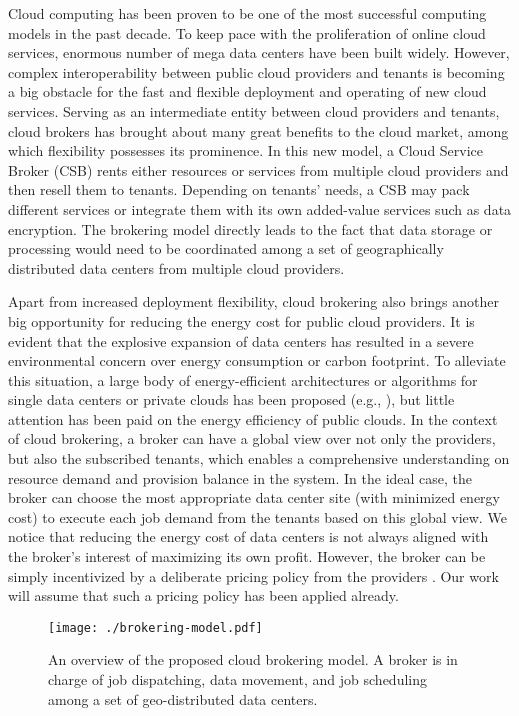 \documentclass{article}
\begin{document}
Cloud computing has been proven to be one of the most successful computing models in the past decade. To keep pace with the proliferation of online cloud services, enormous number of mega data centers have been built widely. However, complex interoperability between public cloud providers and tenants is becoming a big obstacle for the fast and flexible deployment and operating of new cloud services. Serving as an intermediate entity between cloud providers and tenants, cloud brokers has brought about many great benefits to the cloud market, among which flexibility possesses its prominence. In this new model, a Cloud Service Broker (CSB) rents either resources or services from multiple cloud providers and then resell them to tenants. Depending on tenants' needs, a CSB may pack different services or integrate them with its own added-value services such as data encryption. The brokering model directly leads to the fact that data storage or processing would need to be coordinated among a set of geographically distributed data centers from multiple cloud providers.

Apart from increased deployment flexibility, cloud brokering also brings another big opportunity for reducing the energy cost for public cloud providers. It is evident that the explosive expansion of data centers has resulted in a severe environmental concern over energy consumption or carbon footprint. To alleviate this situation, a large body of energy-efficient architectures or algorithms for single data centers or private clouds has been proposed (e.g., \cite{Islam-Colo-2015, Lin-DRS-2011, Wang-GreenDCN-2014}), but little attention has been paid on the energy efficiency of public clouds. In the context of cloud brokering, a broker can have a global view over not only the providers, but also the subscribed tenants, which enables a comprehensive understanding on resource demand and provision balance in the system. In the ideal case, the broker can choose the most appropriate data center site (with minimized energy cost) to execute each job demand from the tenants based on this global view. We notice that reducing the energy cost of data centers is not always aligned with the broker's interest of maximizing its own profit. However, the broker can be simply incentivized by a deliberate pricing policy from the providers \cite{Qiu-CSB-2015}. Our work will assume that such a pricing policy has been applied already.



\begin{figure}
\centering
\texttt{[image: ./brokering-model.pdf]}
\caption{\label{fig:framework}An overview of the proposed cloud brokering model. A broker is in charge of job dispatching, data movement, and job scheduling among a set of geo-distributed data centers.}
\end{figure}
\end{document}

